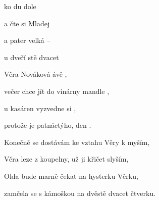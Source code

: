 

\zr
{}  ko du dole 

a čte si  Mladej  

a   pater   velká --

u dveří  stě dvacet 
\kr

\zs
{} Věra Nováková ávě ,

večer chce jít do vinárny  mandle ,

u kasáren vyzvedne si  ,

protože je patnáctýho,  den . 
\ks

\zr \kr

\zs
Konečně se dostávám ke vztahu Věry k myším,

Věra leze z koupelny, už ji křičet slyším,

Olda bude marně čekat na hysterku Věrku,

zamčela se s kámoškou na dvěstě dvacet čtverku.
\ks

\zr  \kr

\kp






